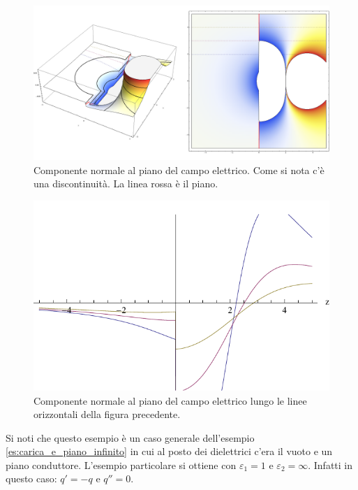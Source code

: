 \begin{Es}
 \begin{figure}[htbp]
  \centering
  \includegraphics[scale=0.2]{immagini/fisica2/campo_due_dielettrici3}
  \caption{Componente normale al piano del campo elettrico. Come si nota c'è una discontinuità. La linea rossa è il piano.}
  \label{fig:campo_piano_dielettrico3}
 \end{figure}
 
 \begin{figure}[htbp]
  \centering
  \includegraphics{immagini/fisica2/campo_due_dielettrici5}
  \caption{Componente normale al piano del campo elettrico lungo le linee orizzontali della figura precedente.}
  \label{fig:campo_piano_dielettrico5}
 \end{figure}
 
 Si noti che questo esempio è un caso generale dell'esempio \ref{es:carica_e_piano_infinito} in cui al posto dei dielettrici c'era il vuoto e un piano conduttore. L'esempio particolare si ottiene con $\varepsilon_1=1$ e $\varepsilon_2=\infty$. Infatti in questo caso: $q'=-q$ e $q''=0$. 
\end{Es}

